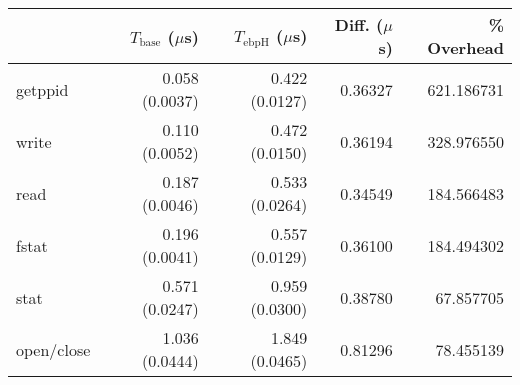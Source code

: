 \begin{tabular}{>{\ttfamily}lrrrr}
\toprule
\multicolumn{1}{l}{System Call} & $T_\text{base}$ ($\mu$s) & $T_\text{ebpH}$ ($\mu$s) &  Diff. ($\mu$s) &  \% Overhead \\
\midrule
                        getppid &           0.058 (0.0037) &           0.422 (0.0127) &         0.36327 &   621.186731 \\
                          write &           0.110 (0.0052) &           0.472 (0.0150) &         0.36194 &   328.976550 \\
                           read &           0.187 (0.0046) &           0.533 (0.0264) &         0.34549 &   184.566483 \\
                          fstat &           0.196 (0.0041) &           0.557 (0.0129) &         0.36100 &   184.494302 \\
                           stat &           0.571 (0.0247) &           0.959 (0.0300) &         0.38780 &    67.857705 \\
                     open/close &           1.036 (0.0444) &           1.849 (0.0465) &         0.81296 &    78.455139 \\
\bottomrule
\end{tabular}
